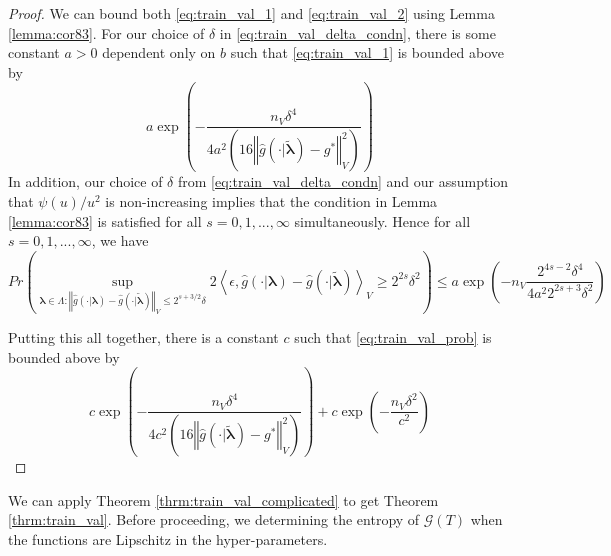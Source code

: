 \documentclass[12pt]{article}
\begin{document}
\begin{proof}
	We can bound both \eqref{eq:train_val_1} and \eqref{eq:train_val_2} using Lemma \ref{lemma:cor83}. For our choice of $\delta$ in \eqref{eq:train_val_delta_condn},
	there is some constant $a>0$ dependent only on $b$ such that \eqref{eq:train_val_1} is bounded above by
	\[ 
	a\exp\left(-\frac{n_{V}\delta^{4}}{4a^{2}\left(16\left\Vert \hat{g}(\cdot|\tilde{\boldsymbol{\lambda}})-g^{*}\right\Vert _{V}^{2}\right)}\right)
	\]
	In addition, our choice of $\delta$ from \eqref{eq:train_val_delta_condn} and our assumption that $\psi(u)/u^2$ is non-increasing implies that the condition in Lemma \ref{lemma:cor83} is satisfied for all $s=0,1,...,\infty$ simultaneously. Hence for all $s=0,1,...,\infty$, we have
	\[
	Pr\left(
	\sup_{\boldsymbol{\lambda} \in \Lambda: \left\Vert \hat{g}(\cdot|{\boldsymbol{\lambda}})-\hat{g}(\cdot|\tilde{\boldsymbol{\lambda}})\right\Vert _{V}
		\le
		2^{s+3/2}\delta}
	2\left\langle \epsilon,\hat{g}(\cdot|{\boldsymbol{\lambda}})-\hat{g}(\cdot|\tilde{\boldsymbol{\lambda}})\right\rangle _{V}
	\ge
	2^{2s} \delta^{2}
	\right)
	\le 
	a\exp\left(-n_{V}\frac{2^{4s-2}\delta^{4}}{4a^{2}2^{2s+3}\delta^{2}}\right)
	\]
	
	Putting this all together, there is a constant $c$ such that \eqref{eq:train_val_prob} is bounded above by
	\begin{equation}
	c\exp\left(-\frac{n_{V}\delta^{4}}{4 c^{2}\left(16\left\Vert \hat{g}(\cdot|\tilde{\boldsymbol{\lambda}})-g^{*}\right\Vert _{V}^{2}\right)}\right)
	+
	c\exp\left(-\frac{n_{V} \delta^2}{c^{2}}\right)
	\end{equation}
	
\end{proof}

We can apply Theorem \ref{thrm:train_val_complicated} to get Theorem \ref{thrm:train_val}. Before proceeding, we determining the entropy of $\mathcal{G}(T)$ when the functions are Lipschitz in the hyper-parameters.
\end{document}
